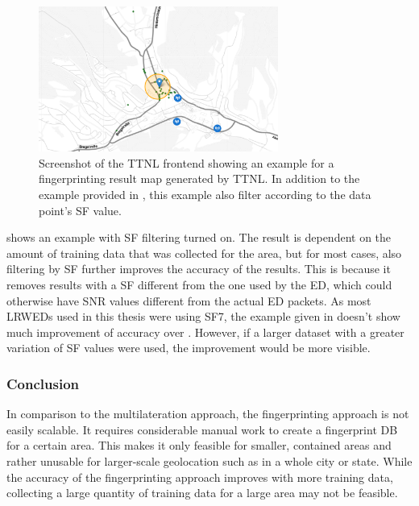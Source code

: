 \begin{figure}[htbp]
    \centering
    \includegraphics[width=0.7\textwidth]{pictures/ttn-locator/frontend/fingerprinting/fingerprinting_map_example_with_snr_sf.png}
    \caption[Example for a fingerprinting result map generated by \acl{TTNL} with \acl{RSS}, \acl{SF} and \acl{SNR} values]{
        Screenshot of the \ac{TTNL} frontend showing an example for a fingerprinting result map generated by \ac{TTNL}.
        In addition to the example provided in , this example also filter according to the data point's \ac{SF} value.
    }\label{fig:fingerprinting-map-example-with-snr-and-sf}
\end{figure}

 shows an example with \ac{SF} filtering turned on.
The result is dependent on the amount of training data that was collected for the area, but for most cases, also filtering by \ac{SF} further improves the accuracy of the results.
This is because it removes results with a \ac{SF} different from the one used by the \acl{ED}, which could otherwise have \ac{SNR} values different from the actual \acl{ED} packets.
As most \aclp{LRWED} used in this thesis were using \ac{SF}7, the example given in  doesn't show much improvement of accuracy over .
However, if a larger dataset with a greater variation of \ac{SF} values were used, the improvement would be more visible.

\subsubsection{Conclusion}

In comparison to the multilateration approach, the fingerprinting approach is not easily scalable.
It requires considerable manual work to create a fingerprint \ac{DB} for a certain area.
This makes it only feasible for smaller, contained areas and rather unusable for larger-scale geolocation such as in a whole city or state.
While the accuracy of the fingerprinting approach improves with more training data, collecting a large quantity of training data for a large area may not be feasible.

